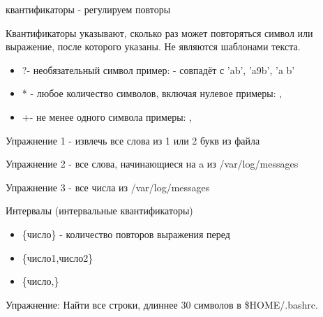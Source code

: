 \begin{frame}[fragile]{квантификаторы - регулируем повторы}

  \alert{Квантификаторы} указывают, сколько раз может повторяться символ или выражение, после которого указаны.  Не являются шаблонами текста.

  \begin{itemize}
    \item \alert{?}\footnotemark[22] - необязательный символ \newline
      пример:  - совпадёт с 'ab', 'a9b', 'a b' \pause
    \item \alert{*} - любое количество символов, включая нулевое \newline
      примеры: , \regex{[[:digit:]]*} \pause
    \item \alert{+}\footnotemark[22] - не менее одного символа \newline
      примеры: \regex{[a-d]+}, 
  \end{itemize}

  \alert{Упражнение 1} - извлечь все слова из 1 или 2 букв из файла
  
  \alert{Упражнение 2} - все слова, начинающиеся на a из /var/log/messages
  
  \alert{Упражнение 3} - все числа из /var/log/messages
\end{frame}

\begin{frame}{Интервалы (интервальные квантификаторы)}
  \begin{itemize}
    \item \alert{\{число\}} - количество повторов выражения перед
    \item \alert{\{число1,число2\}}
    \item \alert{\{число,\}}
  \end{itemize}

  \alert{Упражнение}: Найти все строки, длиннее 30 символов в \$HOME/.bashrc.
\end{frame}


